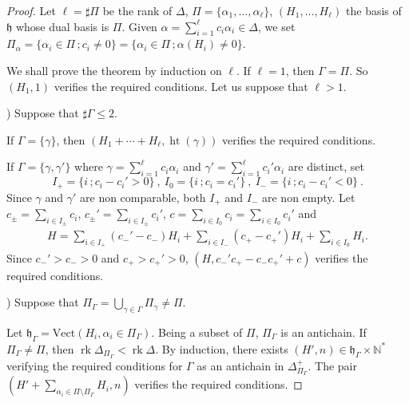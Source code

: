 \documentclass{amsart}
\theoremstyle{definition}
\theoremstyle{remark}
\numberwithin{equation}{section}
\newcommand{\rank}{\mathop{\mathrm{rk}}\nolimits}
\newcommand{\height}{\mathop{\mathrm{ht}}\nolimits}
\begin{document}
\begin{proof}
Let $\ell = \sharp\Pi$ be the rank of $\Delta$, $\Pi = \{ \alpha_{1},\dots ,\alpha_{\ell}\}$,
$(H_{1},\dots ,H_{\ell})$ the basis of $\mathfrak{h}$ whose dual basis is $\Pi$.
Given $\alpha = \sum_{i=1}^{\ell} c_{i}\alpha_{i}\in\Delta$, we set 
$\Pi_{\alpha} = \{ \alpha_{i} \in \Pi \, ; c_{i}\neq 0 \} = \{\alpha_{i} \in \Pi  \, ; \alpha (H_{i}) \neq 0 \}$.
\smallskip

We shall prove the theorem by induction on $\ell$.
If $\ell = 1$, then $\Gamma = \Pi$. So 
$( H_{1}, 1)$ verifies the required conditions. 
Let us suppose that $\ell > 1$.

\smallskip
{}) Suppose that $\sharp \Gamma \leqslant 2$.
\smallskip

If $\Gamma = \{\gamma\}$, then
$(H_{1}+\cdots + H_{\ell}, \height( \gamma ) )$ verifies the required conditions.

If $\Gamma = \{\gamma ,\gamma'\}$ where
$\gamma = \sum_{i=1}^{\ell} c_{i}\alpha_{i}$ and $\gamma' = \sum_{i=1}^{\ell} c_{i}'\alpha_{i}$
are distinct, set 
$$
I_{+} = \{ i \, ; c_{i} -c_{i}' > 0 \} \ , \
I_{0} = \{ i \, ; c_{i}  = c_{i}' \} \ , \
I_{-} = \{ i \, ; c_{i} -c_{i}' < 0 \} \ .
$$
Since $\gamma$ and $\gamma'$ are non comparable, both $I_{+}$ and $I_{-}$ are non empty. 
Let $c_{\pm} = \sum_{i\in I_{\pm}} c_{i}$,
$c_{\pm}' = \sum_{i\in I_{\pm}} c_{i}'$, 
$c = \sum_{i\in I_{0}} c_{i} = \sum_{i\in I_{0}} c_{i}'$ and
$$\begin{array}{c}
H = \sum\limits_{i\in I_{+}} (c_{-}' -c_{-}) H_{i} +  \sum\limits_{i\in I_{-}} (c_{+}- c_{+}') 
H_{i} + \sum\limits_{i\in I_{0}} H_{i}.
\end{array}$$
Since $c_{-}' > c_{-} > 0$ and $c_{+} > c_{+}' > 0$, 
$(H , c_{-}'c_{+} - c_{-} c_{+}'+ c )$ verifies the required conditions. 

\smallskip
{}) Suppose that $\Pi_{\Gamma} = \bigcup_{\gamma\in \Gamma} \Pi_{\gamma} \neq \Pi$.
\smallskip

Let $\mathfrak{h}_{\Gamma}
= \mathrm{Vect}(H_{i} , \alpha_{i}\in\Pi_{\Gamma})$. Being a subset
of $\Pi$, $\Pi_{\Gamma}$ is an antichain. 
If $\Pi_{\Gamma} \neq \Pi$, then
$\rank \Delta_{\Pi_{\Gamma}} < \rank \Delta$. By induction, there exists 
$(H',n) \in \mathfrak{h}_{\Gamma} \times \mathbb{N}^{*}$ verifying the required conditions
for $\Gamma$ as an antichain in $\Delta_{\Pi_{\Gamma}}^{+}$. The pair 
$( H' + \sum_{\alpha_{i}\in \Pi \setminus \Pi_{\Gamma}} H_{i} , n)$
verifies the required conditions.


\end{proof}
\end{document}
